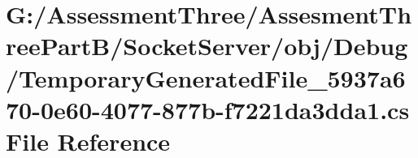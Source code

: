 \hypertarget{_socket_server_2obj_2_debug_2_temporary_generated_file__5937a670-0e60-4077-877b-f7221da3dda1_8cs}{}\section{G\+:/\+Assessment\+Three/\+Assesment\+Three\+Part\+B/\+Socket\+Server/obj/\+Debug/\+Temporary\+Generated\+File\+\_\+5937a670-\/0e60-\/4077-\/877b-\/f7221da3dda1.cs File Reference}
\label{_socket_server_2obj_2_debug_2_temporary_generated_file__5937a670-0e60-4077-877b-f7221da3dda1_8cs}

